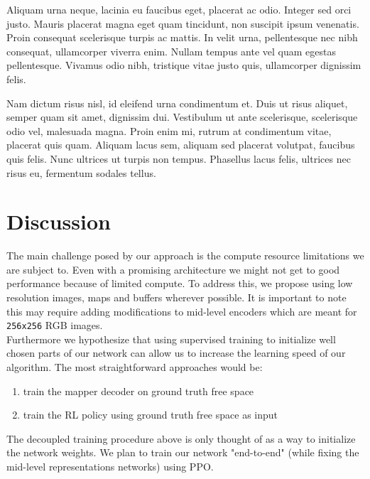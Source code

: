 \documentclass{two-col-epfl}
\begin{document}
Aliquam urna neque, lacinia eu faucibus eget, placerat ac odio. Integer sed orci justo. Mauris placerat magna eget quam tincidunt, non suscipit ipsum venenatis. Proin consequat scelerisque turpis ac mattis. In velit urna, pellentesque nec nibh consequat, ullamcorper viverra enim. Nullam tempus ante vel quam egestas pellentesque. Vivamus odio nibh, tristique vitae justo quis, ullamcorper dignissim felis.

Nam dictum risus nisl, id eleifend urna condimentum et. Duis ut risus aliquet, semper quam sit amet, dignissim dui. Vestibulum ut ante scelerisque, scelerisque odio vel, malesuada magna. Proin enim mi, rutrum at condimentum vitae, placerat quis quam. Aliquam lacus sem, aliquam sed placerat volutpat, faucibus quis felis. Nunc ultrices ut turpis non tempus. Phasellus lacus felis, ultrices nec risus eu, fermentum sodales tellus.



\section{Discussion}
The main challenge posed by our approach is the compute resource limitations we are subject to. Even with a promising architecture we might not get to good performance because of limited compute. To address this, we propose using low resolution images, maps and buffers wherever possible. It is important to note this may require adding modifications to mid-level encoders which are meant for \texttt{256x256} RGB images. \\

Furthermore we hypothesize that using supervised training to initialize well chosen parts of our network can allow us to increase the learning speed of our algorithm. The most straightforward approaches would be:
\begin{enumerate}
    \item train the mapper decoder on ground truth free space
    \item train the RL policy using ground truth free space as input
\end{enumerate}

The decoupled training procedure above is only thought of as a way to initialize the network weights. We plan to train our network "end-to-end" (while fixing the mid-level representations networks) using PPO.
\printbibliography
\end{document}
